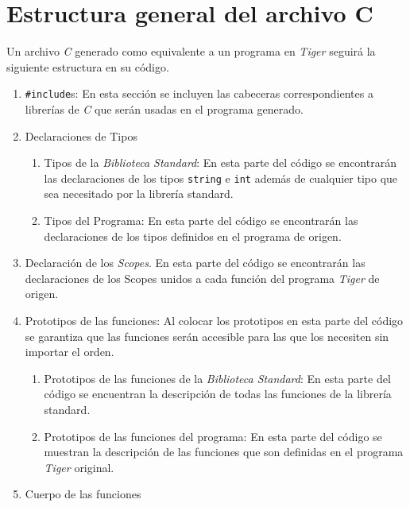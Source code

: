 \documentclass{article}
\begin{document}

\section{Estructura general del archivo C}

Un archivo \textit{C} generado como equivalente a un programa en \textit{Tiger}
seguirá la siguiente estructura en su código.

\begin{enumerate}
  \item \texttt{\#include}s: En esta sección se incluyen las cabeceras
  correspondientes a librerías de \textit{C} que serán usadas en el programa
  generado.
  \item Declaraciones de Tipos
  	\begin{enumerate}
      \item Tipos de la  \textit{Biblioteca Standard}: En esta parte del código se
      encontrarán las declaraciones de los tipos \texttt{string} e \texttt{int}
      además de cualquier tipo que sea necesitado por la librería standard.
      \item Tipos del Programa: En esta parte del código se encontrarán
      las declaraciones de los tipos definidos en el programa de origen.
  	\end{enumerate}
  \item Declaración de los \textit{Scopes}. En esta parte del código se
  encontrarán las declaraciones de los Scopes unidos a cada función del
  programa \textit{Tiger} de origen.
  \item Prototipos de las funciones: Al colocar los prototipos en esta parte
  del código se garantiza que las funciones serán accesible para las que los
  necesiten sin importar el orden.
	\begin{enumerate}
      \item Prototipos de las funciones de la \textit{Biblioteca Standard}: En
      esta parte del código se encuentran la descripción de todas las funciones
      de la librería standard.
      \item Prototipos de las funciones del programa: En esta parte del código
      se muestran la descripción de las funciones que son definidas en el
      programa \textit{Tiger} original.
    \end{enumerate}
  \item Cuerpo de las funciones
 	\begin{itemize}

\end{itemize}
\end{enumerate}
\end{document}
